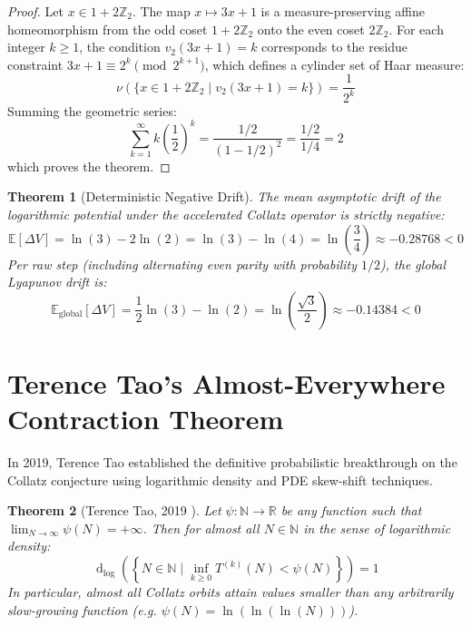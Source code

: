 \documentclass[11pt,a4paper]{article}
\newtheorem{theorem}{Theorem}[section]
\theoremstyle{definition}
\begin{document}
\begin{proof}
Let $x \in 1 + 2\mathbb{Z}_2$. The map $x \mapsto 3x + 1$ is a measure-preserving affine homeomorphism from the odd coset $1 + 2\mathbb{Z}_2$ onto the even coset $2\mathbb{Z}_2$. For each integer $k \ge 1$, the condition $v_2(3x+1) = k$ corresponds to the residue constraint $3x + 1 \equiv 2^k \pmod{2^{k+1}}$, which defines a cylinder set of Haar measure:
\begin{equation}
\nu\left( \{ x \in 1 + 2\mathbb{Z}_2 \mid v_2(3x+1) = k \} \right) = \frac{1}{2^k}
\end{equation}
Summing the geometric series:
\begin{equation}
\sum_{k=1}^\infty k \left(\frac{1}{2}\right)^k = \frac{1/2}{(1 - 1/2)^2} = \frac{1/2}{1/4} = 2
\end{equation}
which proves the theorem.
\end{proof}

\begin{theorem}[Deterministic Negative Drift]\label{thm:negative_drift}
The mean asymptotic drift of the logarithmic potential under the accelerated Collatz operator is strictly negative:
\begin{equation}\label{eq:mean_drift}
\mathbb{E}[\Delta V] = \ln(3) - 2 \ln(2) = \ln(3) - \ln(4) = \ln\left( \frac{3}{4} \right) \approx -0.28768 < 0
\end{equation}
Per raw step (including alternating even parity with probability $1/2$), the global Lyapunov drift is:
\begin{equation}
\mathbb{E}_{\mathrm{global}}[\Delta V] = \frac{1}{2} \ln(3) - \ln(2) = \ln\left( \frac{\sqrt{3}}{2} \right) \approx -0.14384 < 0
\end{equation}
\end{theorem}

\section{Terence Tao's Almost-Everywhere Contraction Theorem}
In 2019, Terence Tao \cite{tao2019} established the definitive probabilistic breakthrough on the Collatz conjecture using logarithmic density and PDE skew-shift techniques.

\begin{theorem}[Terence Tao, 2019 \cite{tao2019}]\label{thm:tao_theorem}
Let $\psi : \mathbb{N} \to \mathbb{R}$ be any function such that $\lim_{N \to \infty} \psi(N) = +\infty$. Then for almost all $N \in \mathbb{N}$ in the sense of logarithmic density:
\begin{equation}
\operatorname{d}_{\log}\left( \left\{ N \in \mathbb{N} \;\Big|\; \inf_{k \ge 0} T^{(k)}(N) < \psi(N) \right\} \right) = 1
\end{equation}
In particular, almost all Collatz orbits attain values smaller than any arbitrarily slow-growing function (e.g. $\psi(N) = \ln(\ln(\ln(N)))$).
\end{theorem}
\end{document}
